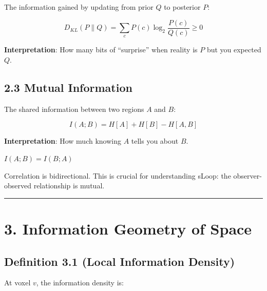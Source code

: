 \documentclass[
  11pt,
  letterpaper,
  twoside,
  openany]{book}
\makeatletter
\let\orig@section\section
\renewcommand{\section}{\needspace{8\baselineskip}\orig@section}
\let\orig@subsection\subsection
\renewcommand{\subsection}{\needspace{6\baselineskip}\orig@subsection}
\makeatother
\begin{document}
The information gained by updating from prior \(Q\) to posterior \(P\):

\[D_{KL}(P \| Q) = \sum_c P(c) \log_2 \frac{P(c)}{Q(c)} \geq 0\]

\textbf{Interpretation}: How many bits of ``surprise'' when reality is
\(P\) but you expected \(Q\).

\subsection{2.3 Mutual Information}\label{mutual-information}

The shared information between two regions \(A\) and \(B\):

\[I(A; B) = H[A] + H[B] - H[A, B]\]

\textbf{Interpretation}: How much knowing \(A\) tells you about \(B\).

\begin{tcolorbox}[enhanced jigsaw, colbacktitle=quarto-callout-important-color!10!white, titlerule=0mm, bottomtitle=1mm, bottomrule=.15mm, colback=white, arc=.35mm, breakable, toprule=.15mm, title=\textcolor{quarto-callout-important-color}{\faExclamation}\hspace{0.5em}{Mutual Information is Symmetric}, rightrule=.15mm, coltitle=black, leftrule=.75mm, colframe=quarto-callout-important-color-frame, toptitle=1mm, opacityback=0, opacitybacktitle=0.6, left=2mm]

\(I(A; B) = I(B; A)\)

Correlation is bidirectional. This is crucial for understanding sLoop:
the observer-observed relationship is mutual.

\end{tcolorbox}

\begin{center}\rule{0.5\linewidth}{0.5pt}\end{center}

\section{3. Information Geometry of
Space}\label{information-geometry-of-space}

\subsection{Definition 3.1 (Local Information
Density)}\label{definition-3.1-local-information-density}

At voxel \(v\), the information density is:
\end{document}
